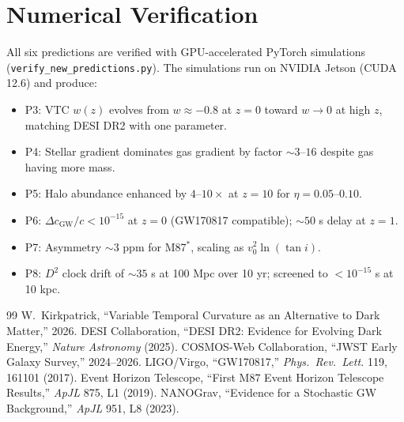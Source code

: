 \documentclass[11pt,a4paper]{article}
\theoremstyle{definition}
\begin{document}
\section{Numerical Verification}

All six predictions are verified with GPU-accelerated PyTorch simulations (\texttt{verify\_new\_predictions.py}). The simulations run on NVIDIA Jetson (CUDA 12.6) and produce:

\begin{itemize}
    \item P3: VTC $w(z)$ evolves from $w \approx -0.8$ at $z=0$ toward $w \to 0$ at high $z$, matching DESI DR2 with one parameter.
    \item P4: Stellar gradient dominates gas gradient by factor $\sim 3$--$16$ despite gas having more mass.
    \item P5: Halo abundance enhanced by $4$--$10\times$ at $z=10$ for $\eta = 0.05$--$0.10$.
    \item P6: $\Delta c_\mathrm{GW}/c < 10^{-15}$ at $z=0$ (GW170817 compatible); $\sim 50$ s delay at $z=1$.
    \item P7: Asymmetry $\sim 3$ ppm for M87$^\ast$, scaling as $v_0^2\ln(\tan i)$.
    \item P8: $D^2$ clock drift of $\sim 35$ s at 100 Mpc over 10 yr; screened to $< 10^{-15}$ s at 10 kpc.
\end{itemize}

\begin{thebibliography}{99}
 W.\ Kirkpatrick, ``Variable Temporal Curvature as an Alternative to Dark Matter,'' 2026.
 DESI Collaboration, ``DESI DR2: Evidence for Evolving Dark Energy,'' \textit{Nature Astronomy} (2025).
 COSMOS-Web Collaboration, ``JWST Early Galaxy Survey,'' 2024--2026.
 LIGO/Virgo, ``GW170817,'' \textit{Phys.\ Rev.\ Lett.} 119, 161101 (2017).
 Event Horizon Telescope, ``First M87 Event Horizon Telescope Results,'' \textit{ApJL} 875, L1 (2019).
 NANOGrav, ``Evidence for a Stochastic GW Background,'' \textit{ApJL} 951, L8 (2023).
\end{thebibliography}
\end{document}
